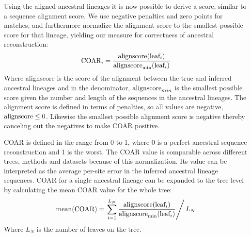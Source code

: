 

Using the aligned ancestral lineages it is now possible to derive a score, similar to a sequence alignment score.
We use negative penalties and zero points for matches, and furthermore normalize the alignment score to the smallest possible score for that lineage, yielding our measure for correctness of ancestral reconstruction:
$$
\text{COAR}_i = \frac{\text{alignscore}(\text{leaf}_i)}{\text{alignscore}_{\min}(\text{leaf}_i)}
$$
Where alignscore is the score of the alignment between the true and inferred ancestral lineages and in the denominator, $\text{alignscore}_{min}$ is the smallest possible score given the number and length of the sequences in the ancestral lineages.
The alignment score is defined in terms of penalties, so all values are negative, $\text{alignscore} \leq 0$.
Likewise the smallest possible alignment score is negative thereby canceling out the negatives to make COAR positive.

COAR is defined in the range from 0 to 1, where 0 is a perfect ancestral sequence reconstruction and 1 is the worst.
The COAR value is comparable across different trees, methods and datasets because of this normalization.
Its value can be interpreted as the average per-site error in the inferred ancestral lineage sequences.
COAR for a single ancestral lineage can be expanded to the tree level by calculating the mean COAR value for the whole tree:
$$
\operatorname{mean}(\text{COAR}) = \left. \sum^{L_N}_{i=1} \frac{\text{alignscore}(\text{leaf}_i)}{\text{alignscore}_{\min}(\text{leaf}_i)} \right/ L_N
$$
Where $L_N$ is the number of leaves on the tree.




